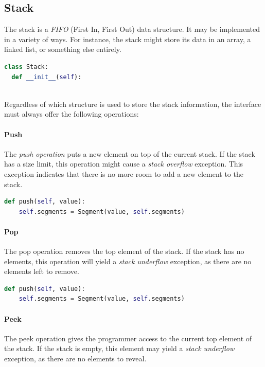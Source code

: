 \documentclass{article}
\begin{document}
\subsection{Stack}
The stack is a {\em FIFO} (First In, First Out) data structure.
It may be implemented in a variety of ways. For instance, the stack might store its data in an array, a linked list, or something else entirely.

\begin{lstlisting}[language=Python]
  class Stack:
  def __init__(self):
    
\end{lstlisting}

Regardless of which structure is used to store the stack information, the interface must always offer the following operations:

\paragraph{Push}
The {\em push operation} puts a new element on top of the current stack.
If the stack has a size limit, this operation might cause a {\em stack overflow} exception.
This exception indicates that there is no more room to add a new element to the stack.

\begin{lstlisting}[language=Python]
  def push(self, value):
    self.segments = Segment(value, self.segments)
\end{lstlisting}

\paragraph{Pop}
The pop operation removes the top element of the stack. If the stack has no elements, this operation will yield a {\em stack underflow} exception,
as there are no elements left to remove.

\begin{lstlisting}[language=Python]
  def push(self, value):
    self.segments = Segment(value, self.segments)
\end{lstlisting}

\paragraph{Peek}
The peek operation gives the programmer access to the current top element of the stack.
If the stack is empty, this element may yield a {\em stack underflow} exception, as there are no elements to reveal.
\end{document}
